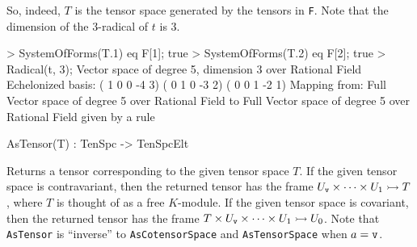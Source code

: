 \begin{example}[TensorsToSpaces]
So, indeed, $T$ is the tensor space generated by the tensors in \texttt{F}. 
Note that the dimension of the 3-radical of $t$ is 3.
\begin{code}
> SystemOfForms(T.1) eq F[1];
true
> SystemOfForms(T.2) eq F[2];
true
> Radical(t, 3);
Vector space of degree 5, dimension 3 over Rational Field
Echelonized basis:
( 1  0  0 -4  3)
( 0  1  0 -3  2)
( 0  0  1 -2  1)
Mapping from: Full Vector space of degree 5 over Rational Field to Full 
Vector space of degree 5 over Rational Field given by a rule
\end{code}
\end{example}

\begin{intrinsics}
AsTensor(T) : TenSpc -> TenSpcElt
\end{intrinsics}

Returns a tensor corresponding to the given tensor space $T$. If the given
tensor space is contravariant, then the returned tensor has the frame
$U_{\operatorname{\mathtt{v}}}\times \cdots \times U_1\rightarrowtail T$, where $T$ is thought of as
a free $K$-module. If the given tensor space is covariant, then the returned
tensor has the frame $T\times U_{\operatorname{\mathtt{v}}}\times \cdots \times U_1\rightarrowtail
U_0$. Note that \texttt{AsTensor} is ``inverse'' to \texttt{AsCotensorSpace} and
\texttt{AsTensorSpace} when $a=\operatorname{\mathtt{v}}$.

